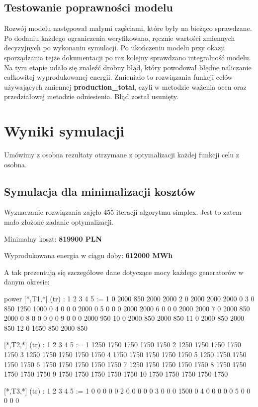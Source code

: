 \documentclass[12pt, twoside, hidelinks, a4paper]{article}
\begin{document}
\subsection{Testowanie poprawności modelu}
Rozwój modelu następował małymi częściami, które były na bieżąco sprawdzane. Po dodaniu każdego ograniczenia weryfikowano, ręcznie wartości zmiennych decyzyjnych po wykonaniu symulacji. Po ukończeniu modelu przy okazji sporządzania tejże dokumentacji po raz kolejny sprawdzano integralność modelu. Na tym etapie udało się znaleźć drobny błąd, który powodował błędne naliczanie całkowitej wyprodukowanej energii. Zmieniało to rozwiązania funkcji celów używających zmiennej \textbf{production\_total}, czyli w metodzie ważenia ocen oraz przedziałowej metodzie odniesienia. Błąd został usunięty.

\section{Wyniki symulacji}
Umówimy z osobna rezultaty otrzymane z optymalizacji każdej funkcji celu z osobna.

\subsection{Symulacja dla minimalizacji kosztów} \label{sec:cost_min}
Wyznaczanie rozwiązania zajęło 455 iteracji algorytmu simplex. Jest to zatem mało złożone zadanie optymalizacji.

Minimalny koszt: \textbf{819900 PLN}

Wyprodukowana energia w ciągu doby: \textbf{612000 MWh}

A tak prezentują się szczegółowe dane dotyczące mocy każdego generatorów w danym okresie:

\begin{boxedverbatim}
power [*,T1,*] (tr)
:    1    2      3      4      5      :=
1    0   2000    850   2000   2000
2    0   2000   2000   2000      0
3    0    850   1250   1000      0
4    0      0      0   2000      0
5    0      0      0   2000   2000
6    0      0      0   2000   2000
7    0   2000    850   2000      0
8    0      0      0      0      0
9    0      0      0   2000    950
10   0   2000    850   2000    850
11   0   2000    850   2000    850
12   0   1650    850   2000    850

 [*,T2,*] (tr)
:     1      2      3      4      5      :=
1    1250   1750   1750   1750   1750
2    1250   1750   1750   1750   1750
3    1250   1750   1750   1750   1750
4    1750   1750   1750   1750   1750
5    1250   1750   1750   1750   1750
6    1750   1750   1750   1750   1750
7    1250   1750   1750   1750   1750
8    1750   1750   1750   1750   1750
9    1750   1750   1750   1750   1750
10   1750   1750   1750   1750   1750

 [*,T3,*] (tr)
:   1   2   3    4     5    :=
1   0   0   0      0   0
2   0   0   0      0   0
3   0   0   0   1500   0
4   0   0   0      0   0
5   0   0   0      0   0
\end{boxedverbatim}
\end{document}
